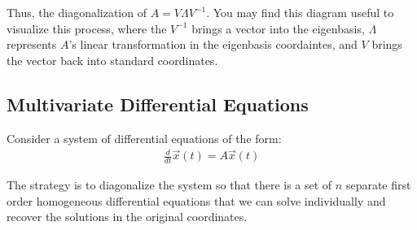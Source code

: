 Thus, the diagonalization of $\boxed{A = V \Lambda V^{-1}}$. You may find this diagram useful to visualize this process, where the $V^{-1}$ brings a vector into the eigenbasis, $\Lambda$ represents $A$'s linear transformation in the eigenbasis coordaintes, and $V$ brings the vector back into standard coordinates.
\begin{figure}[H]
    \centering
\end{figure}

\subsection*{Multivariate Differential Equations}
Consider a system of differential equations of the form:
\begin{align*}
    \frac{d}{dt} \vec{x}(t) = A \vec{x}(t)
\end{align*}

The strategy is to diagonalize the system so that there is a set of $n$ separate first order homogeneous differential equations that we can solve individually and recover the solutions in the original coordinates.

